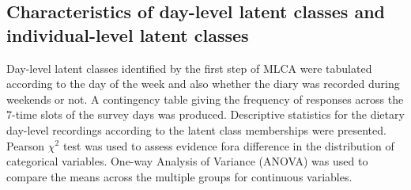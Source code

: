 %
%
%



\subsection{Characteristics of day-level latent classes and individual-level latent classes}\vspace{-0.3cm}


Day-level latent classes identified by the first step of MLCA were tabulated according to the day of the week and also whether the diary was recorded during weekends or not. A contingency table giving the frequency of responses across the 7-time slots of the survey days was produced. Descriptive statistics for the dietary day-level recordings according to the latent class memberships were presented. Pearson $\chi^2$ test was used to assess evidence fora difference in the distribution of categorical variables. One-way Analysis of Variance (ANOVA) was used to compare the means across the multiple groups for continuous variables.

